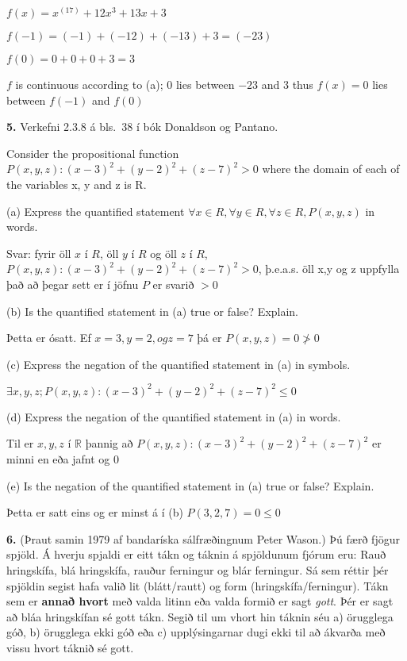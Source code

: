\documentclass[12pt]{article}
\begin{document}
$f(x)=x^(17) + 12x^3 + 13x + 3$

$f(-1) = (-1) + (-12) + (-13) + 3 = (-23)$

$f(0) = 0+0+0+3 = 3$

$f$ is continuous according to (a); $0$ lies between $-23$ and $3$ thus $f(x)=0$ lies between $f(-1)$ and $f(0)$

\smallskip

\newpage

{\bf 5.}  Verkefni 2.3.8 á bls.~38 í bók Donaldson og Pantano.

Consider the propositional function $P(x,y,z): (x - 3)^2+(y - 2)^2 + (z - 7)^2 >0$
where the domain of each of the variables x, y and z is R.

(a) Express the quantified statement $\forall x \in R, \forall y \in R, \forall z \in R, P(x, y, z)$ in words.

Svar: fyrir öll $x$ í $R$, öll $y$ í $R$ og öll $z$ í $R$, $P(x,y,z): (x-3)^2+(y-2)^2+(z-7)^2 >0$, þ.e.a.s. öll x,y og z uppfylla það að þegar sett er í jöfnu $P$ er svarið $>0$ 

(b) Is the quantified statement in (a) true or false? Explain.


Þetta er ósatt. Ef $x=3,y=2, og z=7$ þá er $P(x,y,z)=0\not> 0$


(c) Express the negation of the quantified statement in (a) in symbols.

$\exists x,y,z; P(x,y,z): (x-3)^2+(y-2)^2+(z-7)^2 \leq 0$

(d) Express the negation of the quantified statement in (a) in words.

Til er $x,y,z$ í $\mathbb{R}$ þannig að $P(x,y,z): (x-3)^2+(y-2)^2+(z-7)^2$ er minni en eða jafnt og $0$

(e) Is the negation of the quantified statement in (a) true or false? Explain.

Þetta er satt eins og er minst á í (b) $P(3,2,7)=0 \leq 0$


\bigskip
\bigskip
\bigskip

{\bf 6.}    (Þraut samin 1979 af bandaríska sálfræðingnum Peter Wason.)  Þú færð fjögur spjöld.  Á hverju spjaldi er eitt tákn og táknin á spjöldunum fjórum eru:  Rauð hringskífa, blá hringskífa, rauður ferningur og blár ferningur.  Sá sem réttir þér spjöldin segist hafa valið lit (blátt/rautt)  og form (hringskífa/ferningur).  Tákn sem er {\bf annað hvort} með valda litinn eða valda formið er sagt {\em gott}.   Þér er sagt að bláa hringskífan sé gott tákn.  Segið til um vhort hin táknin séu a) örugglega góð, b) örugglega ekki góð eða c) upplýsingarnar dugi ekki til að ákvarða með vissu hvort táknið sé gott.  
  
\end{document}
